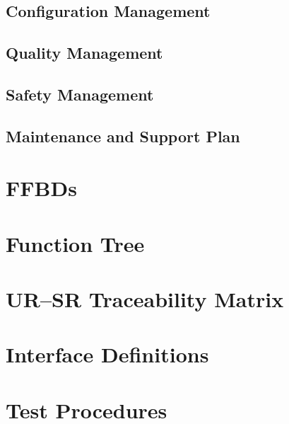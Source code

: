 \documentclass[a4paper,10pt]{article}
\begin{document}
\subsection{Configuration Management}

\subsection{Quality Management}

\subsection{Safety Management}

\subsection{Maintenance and Support Plan}

\newpage

\printbibliography

\newpage

\appendix

\section{FFBDs}

\section{Function Tree}

\section{UR--SR Traceability Matrix}

\section{Interface Definitions}

\section{Test Procedures}
\end{document}
